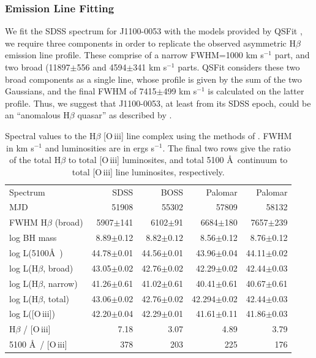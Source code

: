 \documentclass[a4paper,fleqn,usenatbib]{mnras}
\begin{document}
\subsubsection{Emission Line Fitting} 
We fit the SDSS spectrum for J1100-0053 with the models provided by
QSFit \citep[see][and
\href{http://qsfit.inaf.it/}{http://qsfit.inaf.it/} ]{Calderone2017},
we require three components in order to replicate the observed
asymmetric H$\beta$ emission line profile.  These comprise of a narrow
FWHM=1000 km s$^{-1}$ part, and two broad (11897$\pm$556 and
4594$\pm$341 km s$^{-1}$ parts.  QSFit considers these two broad
components as a single line, whose profile is given by the sum of the
two Gaussians, and the final FWHM of 7415$\pm$499 km s$^{-1}$ is
calculated on the latter profile.  Thus, we suggest that J1100-0053,
at least from its SDSS epoch, could be an ``anomalous H$\beta$
quasar'' as described by \citet{Steinhardt_Silverman2013}.

\begin{table}
 \centering
  \begin{tabular}{l r r r r}
    \hline \hline 
    Spectrum                             &	SDSS  &	BOSS    &	Palomar  & Palomar \\
    MJD                                     &    51908 &  55302  &    57809   &  58132   \\          
    \hline   
    FWHM H$\beta$ (broad)     &  5907$\pm$141      & 6102$\pm$91    & 6684$\pm$180  &7657$\pm$239  \\
    log BH mass                       & 8.89$\pm$0.12       & 8.82$\pm0.12$  & 8.56$\pm$0.12  & 8.76$\pm$0.12  \\
   log L(5100\AA\ )                 & 44.78$\pm$0.01   &44.56$\pm$0.01  &43.96$\pm$0.04 & 44.11$\pm$0.02 \\
  log L(H$\beta$, broad)        & 43.05$\pm$0.02    & 42.76$\pm$0.02 &42.29$\pm$0.02   & 42.44$\pm$0.03 \\
    log L(H$\beta$, narrow)    & 41.26$\pm$0.61     & 41.02$\pm$0.61 & 40.41$\pm$0.61 & 40.67$\pm$0.61\\
   log L(H$\beta$, total)         & 43.06$\pm$0.02    &42.76$\pm$0.02 &42.294$\pm$0.02 & 42.44$\pm$0.03\\
log  L([O\,{\sc iii}])                & 42.20$\pm$0.04   &42.29$\pm$0.01 & 41.61$\pm$0.11& 41.86$\pm$0.03 \\
    H$\beta$  / [O\,{\sc iii}]         &  7.18 & 3.07   & 4.89 & 3.79  \\
   5100 \AA\  / [O\,{\sc iii}]         &  378 &  203 &  225 & 176  \\
   \hline \hline 
 \end{tabular}
 \caption{Spectral values to the H$\beta$ [O\,{\sc iii}] line complex using the methods
    of \citet{Jun2015a}.  FWHM in km s$^{-1}$ and luminosities are in ergs s$^{-1}$.  
  The final two rows give the ratio of the total H$\beta$ to total [O\,{\sc iii}] luminosites, 
and total 5100 \AA\ continuum to total [O\,{\sc iii}] line luminosites, respectively.} 
\label{tab:Hbeta_details}
\end{table}
\end{document}
